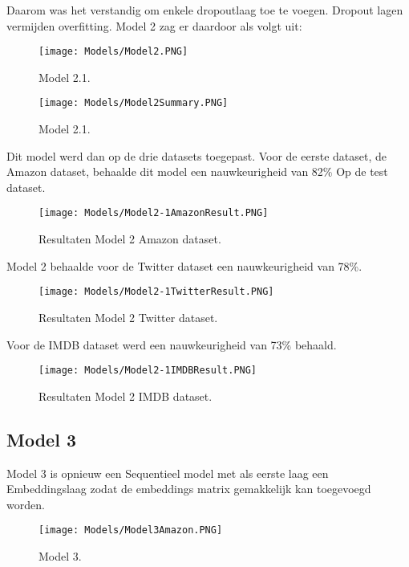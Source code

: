 Daarom was het verstandig om enkele \gls{dropoutlaag} toe te voegen. Dropout lagen vermijden overfitting. Model 2 zag er daardoor als volgt uit:

\begin{figure}[!htbp]
    \texttt{[image: Models/Model2.PNG]}
    \caption{\label{model2.1} Model 2.1.}
\end{figure}
\FloatBarrier

\begin{figure}[!htbp]
    \texttt{[image: Models/Model2Summary.PNG]}
    \caption{\label{model2.1summary} Model 2.1.}
\end{figure}
\FloatBarrier


Dit model werd dan op de drie datasets toegepast. Voor de eerste dataset, de Amazon dataset, behaalde dit model een nauwkeurigheid van 82\% Op de test dataset.

\begin{figure}[!htbp]
    \texttt{[image: Models/Model2-1AmazonResult.PNG]}
    \caption{\label{amazonresult2}Resultaten Model 2 Amazon dataset.}
\end{figure}
\FloatBarrier

Model 2 behaalde voor de Twitter dataset een nauwkeurigheid van 78\%.

\begin{figure}[!htbp]
    \texttt{[image: Models/Model2-1TwitterResult.PNG]}
    \caption{\label{twitterresult2}Resultaten Model 2 Twitter dataset.}
\end{figure}
\FloatBarrier

Voor de IMDB dataset werd een nauwkeurigheid van 73\% behaald.

\begin{figure}[!htbp]
    \texttt{[image: Models/Model2-1IMDBResult.PNG]}
    \caption{\label{imdbresult2}Resultaten Model 2 IMDB dataset.}
\end{figure}
\FloatBarrier

\subsection{Model 3}

Model 3 is opnieuw een Sequentieel model met als eerste laag een Embeddingslaag zodat de embeddings matrix gemakkelijk kan toegevoegd worden.

\begin{figure}[!htbp]
    \texttt{[image: Models/Model3Amazon.PNG]}
    \caption{\label{model3}Model 3.}
\end{figure}
\FloatBarrier

